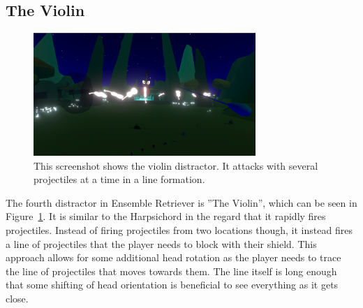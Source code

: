 \subsection{The Violin}
\begin{figure}[tbph]
    \centering
    \includegraphics[width=0.75\textwidth]{figures/screenshots/violin.png}
    \caption[The Violin Distractor]{This screenshot shows the violin distractor. It attacks with several projectiles at a time in a line formation.}
    \label{fig:violinDistractor}
\end{figure}
The fourth distractor in Ensemble Retriever is ''The Violin'', which can be seen in Figure~\ref{fig:violinDistractor}. It is similar to the Harpsichord in the regard that it rapidly fires projectiles. Instead of firing projectiles from two locations though, it instead fires a line of projectiles that the player needs to block with their shield. This approach allows for some additional head rotation as the player needs to trace the line of projectiles that moves towards them. The line itself is long enough that some shifting of head orientation is beneficial to see everything as it gets close. 


